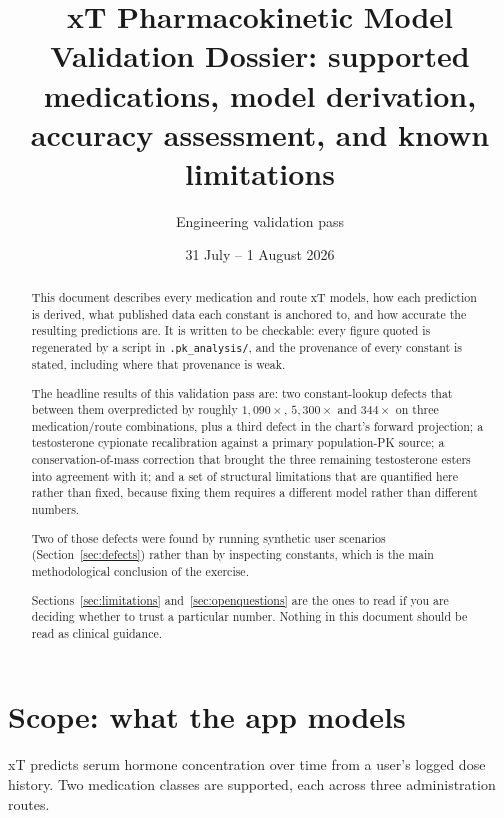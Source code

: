 \documentclass[11pt,a4paper]{article}
\title{\textbf{xT Pharmacokinetic Model}\\[0.3em]
       \large Validation Dossier: supported medications, model derivation,\\
       accuracy assessment, and known limitations}
\author{Engineering validation pass}
\date{31 July -- 1 August 2026}
\newcommand{\code}[1]{\texttt{\small #1}}
\begin{document}
\maketitle

\begin{abstract}
\noindent
This document describes every medication and route xT models, how each
prediction is derived, what published data each constant is anchored to, and how
accurate the resulting predictions are. It is written to be checkable: every
figure quoted is regenerated by a script in \code{.pk\_analysis/}, and the
provenance of every constant is stated, including where that provenance is weak.

The headline results of this validation pass are: two constant-lookup defects that
between them overpredicted by roughly $1{,}090\times$, $5{,}300\times$ and
$344\times$ on three medication/route combinations, plus a third defect in the
chart's forward projection; a testosterone cypionate recalibration against a
primary population-PK source; a conservation-of-mass correction that brought the
three remaining testosterone esters into agreement with it; and a set of
structural limitations that are quantified here rather than fixed, because fixing
them requires a different model rather than different numbers.

Two of those defects were found by running synthetic user scenarios
(Section~\ref{sec:defects}) rather than by inspecting constants, which is the main
methodological conclusion of the exercise.

Sections~\ref{sec:limitations} and~\ref{sec:openquestions} are the ones to read
if you are deciding whether to trust a particular number. Nothing in this document
should be read as clinical guidance.
\end{abstract}

\tableofcontents
\clearpage

\section{Scope: what the app models}

xT predicts serum hormone concentration over time from a user's logged dose
history. Two medication classes are supported, each across three administration
routes.
\end{document}
